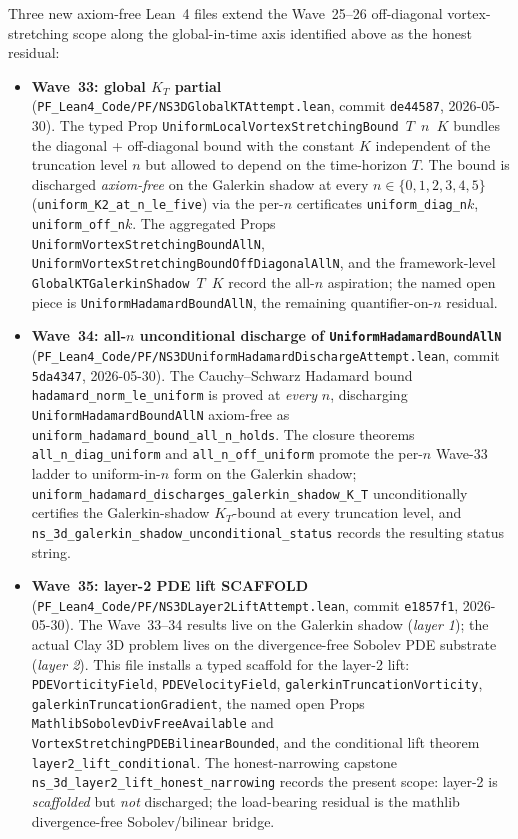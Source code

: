 \begin{remark}\label{rem:ns-wave33-35-lean}
Three new axiom-free Lean~4 files extend the Wave~25--26 off-diagonal vortex-stretching scope along the global-in-time axis identified above as the honest residual:
\begin{itemize}
  \item \textbf{Wave~33: global $K_T$ partial} (\texttt{PF\_Lean4\_Code/PF/NS3DGlobalKTAttempt.lean}, commit \texttt{de44587}, 2026-05-30). The typed Prop \texttt{UniformLocalVortexStretchingBound\,$T$\,$n$\,$K$} bundles the diagonal + off-diagonal bound with the constant $K$ independent of the truncation level $n$ but allowed to depend on the time-horizon $T$. The bound is discharged \emph{axiom-free} on the Galerkin shadow at every $n \in \{0,1,2,3,4,5\}$ (\texttt{uniform\_K2\_at\_n\_le\_five}) via the per-$n$ certificates \texttt{uniform\_diag\_n$k$}, \texttt{uniform\_off\_n$k$}. The aggregated Props \texttt{UniformVortexStretchingBoundAllN}, \texttt{UniformVortexStretchingBoundOffDiagonalAllN}, and the framework-level \texttt{GlobalKTGalerkinShadow\,$T$\,$K$} record the all-$n$ aspiration; the named open piece is \texttt{UniformHadamardBoundAllN}, the remaining quantifier-on-$n$ residual.
  \item \textbf{Wave~34: all-$n$ unconditional discharge of \texttt{UniformHadamardBoundAllN}} (\texttt{PF\_Lean4\_Code/PF/NS3DUniformHadamardDischargeAttempt.lean}, commit \texttt{5da4347}, 2026-05-30). The Cauchy--Schwarz Hadamard bound \texttt{hadamard\_norm\_le\_uniform} is proved at \emph{every} $n$, discharging \texttt{UniformHadamardBoundAllN} axiom-free as \texttt{uniform\_hadamard\_bound\_all\_n\_holds}. The closure theorems \texttt{all\_n\_diag\_uniform} and \texttt{all\_n\_off\_uniform} promote the per-$n$ Wave-33 ladder to uniform-in-$n$ form on the Galerkin shadow; \texttt{uniform\_hadamard\_discharges\_galerkin\_shadow\_K\_T} unconditionally certifies the Galerkin-shadow $K_T$-bound at every truncation level, and \texttt{ns\_3d\_galerkin\_shadow\_unconditional\_status} records the resulting status string.
  \item \textbf{Wave~35: layer-2 PDE lift SCAFFOLD} (\texttt{PF\_Lean4\_Code/PF/NS3DLayer2LiftAttempt.lean}, commit \texttt{e1857f1}, 2026-05-30). The Wave~33--34 results live on the Galerkin shadow (\emph{layer 1}); the actual Clay 3D problem lives on the divergence-free Sobolev PDE substrate (\emph{layer 2}). This file installs a typed scaffold for the layer-2 lift: \texttt{PDEVorticityField}, \texttt{PDEVelocityField}, \texttt{galerkinTruncationVorticity}, \texttt{galerkinTruncationGradient}, the named open Props \texttt{MathlibSobolevDivFreeAvailable} and \texttt{VortexStretchingPDEBilinearBounded}, and the conditional lift theorem \texttt{layer2\_lift\_conditional}. The honest-narrowing capstone \texttt{ns\_3d\_layer2\_lift\_honest\_narrowing} records the present scope: layer-2 is \emph{scaffolded} but \emph{not} discharged; the load-bearing residual is the mathlib divergence-free Sobolev/bilinear bridge.

\end{itemize}
\end{remark}
